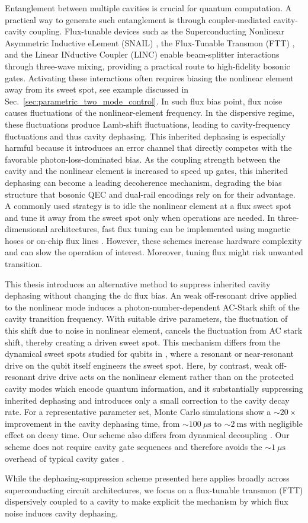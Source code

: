 Entanglement between multiple cavities is crucial for quantum computation. A practical way to generate such entanglement is through coupler-mediated cavity-cavity coupling. Flux-tunable devices such as the Superconducting Nonlinear Asymmetric Inductive eLement (SNAIL) \cite{Chapman2023}, the Flux-Tunable Transmon (FTT) \cite{squid}, and the Linear INductive Coupler (LINC) \cite{linc} enable beam-splitter interactions through three-wave mixing, providing a practical route to high-fidelity bosonic gates. Activating these interactions often requires biasing the nonlinear element away from its sweet spot, see example discussed in Sec.\ \ref{sec:parametric_two_mode_control}. In such flux bias point, flux noise causes fluctuations of the nonlinear-element frequency. In the dispersive regime, these fluctuations produce Lamb-shift fluctuations, leading to cavity-frequency fluctuations and thus cavity dephasing. This inherited dephasing is especially harmful because it introduces an error channel that directly competes with the favorable photon-loss-dominated bias. As the coupling strength between the cavity and the nonlinear element is increased to speed up gates, this inherited dephasing can become a leading decoherence mechanism, degrading the bias structure that bosonic QEC and dual-rail encodings rely on for their advantage.
A commonly used strategy is to idle the nonlinear element at a flux sweet spot and tune it away from the sweet spot only when operations are needed. In three-dimensional architectures, fast flux tuning can be implemented using magnetic hoses \cite{magnetichose1,magnetichose2} or on-chip flux lines \cite{li2025,valadares2026}. However, these schemes increase hardware complexity and can slow the operation of interest. Moreover, tuning flux might risk unwanted transition. 

This thesis introduces an alternative method to suppress inherited cavity dephasing without changing the dc flux bias. An weak off-resonant drive applied to the nonlinear mode induces a photon-number-dependent AC-Stark shift of the cavity transition frequency. With suitable drive parameters, the fluctuation of this shift due to noise in nonlinear element, cancels the fluctuation from AC stark shift, thereby creating a driven sweet spot. This mechanism differs from the dynamical sweet spots studied for qubits in \cite{PhysRevApplied.15.034065floquetqubit,PhysRevApplied.12.054015dss2}, where a resonant or near-resonant drive on the qubit itself engineers the sweet spot. Here, by contrast, weak off-resonant drive drive acts on the nonlinear element rather than on the protected cavity modes which encode quantum information, and it substantially suppressing inherited dephasing and introduces only a small correction to the cavity decay rate. For a representative parameter set, Monte Carlo simulations show a \(\sim 20\times\) improvement in the cavity dephasing time, from \(\sim 100~\mu\text{s}\) to \(\sim 2~\text{ms}\) with negligible effect on decay time. Our scheme also differs from dynamical decoupling \cite{PhysRev.175.453DD}. Our scheme does not require cavity gate sequences and therefore avoids the \(\sim 1~\mu\text{s}\) overhead of typical cavity gates \cite{smcc-t465snap,eickbusch2022ecd}. 

While the dephasing-suppression scheme presented here applies broadly across superconducting circuit architectures, we focus on a flux-tunable transmon (FTT) dispersively coupled to a cavity to make explicit the mechanism by which flux noise induces cavity dephasing.